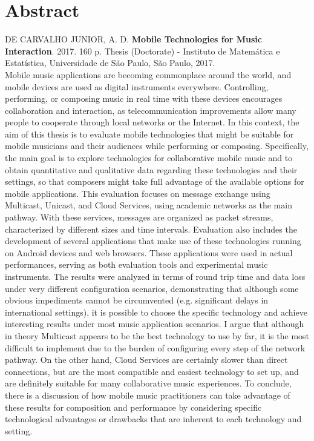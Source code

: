 \documentclass[11pt,twoside,a4paper]{book}
\begin{document}
	
	
	\chapter*{Abstract}
	\noindent DE CARVALHO JUNIOR, A. D. \textbf{Mobile Technologies for Music Interaction}. 
	2017. 160 p.
	Thesis (Doctorate) - Instituto de Matemática e Estatística,
	Universidade de São Paulo, São Paulo, 2017.
	\\
	
	Mobile music applications are becoming commonplace around the world, and mobile devices are used as digital instruments everywhere.
	Controlling, performing, or composing music in real time with these devices encourages collaboration and interaction, as telecommunication improvements allow many people to cooperate through local networks or the Internet.
	In this context, the aim of this thesis is to evaluate mobile technologies that might be suitable for mobile musicians and their audiences while performing or composing.
	Specifically, the main goal is to explore technologies for collaborative mobile music and to obtain quantitative and qualitative data regarding these technologies and their settings, so that composers might take full advantage of the available options for mobile applications.
	This evaluation focuses on message exchange using Multicast, Unicast, and Cloud Services, using academic networks as the main pathway.
	With these services, messages are organized as packet streams, characterized by different sizes and time intervals.
	Evaluation also includes the development of several applications that make use of these technologies running on Android devices and web browsers. 
	These applications were used in actual performances, serving as both evaluation tools and experimental music instruments.
	The results were analyzed in terms of round trip time and data loss under very different configuration scenarios, demonstrating that although some obvious impediments cannot be circumvented (e.g. significant delays in international settings), it is possible to choose the specific technology and achieve interesting results under most music application scenarios.
	I argue that although in theory Multicast appears to be the best technology to use by far, it is the most difficult to implement due to the burden of configuring every step of the network pathway.
	On the other hand, Cloud Services are certainly slower than direct connections, but are the most compatible and easiest technology to set up, and are definitely suitable for many collaborative music experiences.
	To conclude, there is a discussion of how mobile music practitioners can take advantage of these results for composition and performance by considering specific technological advantages or drawbacks that are inherent to each technology and setting.
	\\
	
\end{document}
